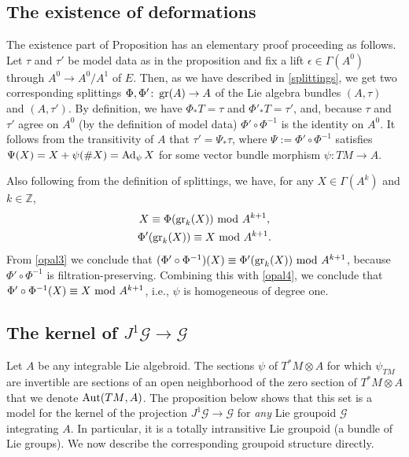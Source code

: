 \documentclass[leqno,12pt]{amsart} %
\begin{document}
\subsection{The existence of deformations}\label{existence_deformations}
The existence part of Proposition  has an elementary proof
proceeding as follows. Let $\tau$ and $\tau'$ be model data as in the proposition and fix
a lift $\epsilon \in \Gamma(A^0)$ through $A^0 \rightarrow A^0/A^1$ of $E$. Then, as we
have described in \ref{splittings}, we get two corresponding splittings
$\Phi, \Phi' \colon \operatorname{\operatorname{gr}}(A) \rightarrow A $ of the Lie algebra bundles $(A, \tau)$ and
$(A, \tau')$. By definition, we have $\Phi_*T=\tau $ and $\Phi'_*T= \tau'$, and, because
$\tau $ and $\tau' $ agree on $A^0$ (by the definition of model data)
$\Phi' \circ \Phi^{-1}$ is the identity on $A^0$. It follows from the transitivity of $A$
that $\tau' = \Psi_* \tau$, where $\Psi := \Phi' \circ \Phi^{-1}$ satisfies
$\Psi(X) = X + \psi (\#X)=\operatorname{Ad}_\psi X$ for some vector bundle morphism
$\psi \colon TM \rightarrow A$.

Also following from the definition of splittings, we have, for any $X \in \Gamma(A^k)$ and
$k \in {\mathbb Z}$,
\begin{gather}
  X \equiv \Phi(\operatorname{\operatorname{gr}}_k(X)) ~\mathrm{mod}~ A^{k+1},\label{opal3}\\
  \Phi'(\operatorname{\operatorname{gr}}_k(X)) \equiv X ~\mathrm{mod}~ A^{k+1}.\label{opal4}
\end{gather}
From \eqref{opal3} we conclude that
$(\Phi' \circ \Phi^{-1})(X) \equiv \Phi'(\operatorname{\operatorname{gr}}_k(X)) ~\mathrm{mod}~ A^{k+1}$, because
$\Phi' \circ \Phi^{-1}$ is filtration-preserving. Combining this with \eqref{opal4}, we
conclude that $\Phi' \circ \Phi^{-1}(X) \equiv X ~\mathrm{mod}~ A^{k+1}$, i.e., $\psi$ is
homogeneous of degree one.

\subsection{The kernel of $J^1 {\mathcal G} \rightarrow {\mathcal G} $}\label{kernel}

Let $A$ be any integrable Lie algebroid. The sections $\psi$ of $T^*\!M \otimes A$ for
which $\psi_{TM}$ are invertible are sections of an open neighborhood of the zero section
of $T^*\!M \otimes A$ that we denote $\operatorname{Aut}({TM},A)$. The proposition below shows that this set
is a model for the kernel of the projection $J^1 {\mathcal G} \rightarrow {\mathcal G} $
for {\em any} Lie groupoid ${\mathcal G} $ integrating $A$. In particular, it is a totally
intransitive Lie groupoid (a bundle of Lie groups). We now describe the corresponding
groupoid structure directly.
\end{document}
